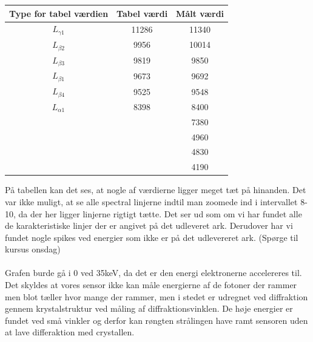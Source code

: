 \documentclass[a4paper,twoside]{article}
\begin{document}
\begin{center}
\begin{tabular}{||c c c ||} 
 \hline
 Type for tabel værdien & Tabel værdi & Målt værdi \\ [0.5ex] 
 \hline\hline
 $L_{\gamma1}$ & 11286 & 11340  \\ 
 \hline
  $L_{\beta2}$ & 9956 & 10014 \\ 
 \hline
$L_{\beta3}$ & 9819  & 9850  \\
 \hline
 $L_{\beta1}$ & 9673 & 9692 \\ [1ex] 
 \hline
 $L_{\beta4}$ & 9525 & 9548 \\
 \hline
 $L_{\alpha1}$ & 8398 & 8400 \\ [1ex] 
  \hline
 & & 7380 \\ [1ex] 
  \hline
 & & 4960 \\ [1ex]  
 \hline
  & & 4830 \\ [1ex] 
 \hline
  & & 4190\\ [ex] 
 \hline
\end{tabular}
\end{center}
På tabellen kan det ses, at nogle af værdierne ligger meget tæt på hinanden. Det var ikke muligt, at se alle spectral linjerne indtil man zoomede ind i intervallet 8-10, da der her ligger linjerne rigtigt tætte. Det ser ud som om vi har fundet alle de karakteristiske linjer der er angivet på det udleveret ark. Derudover har vi fundet nogle spikes ved energier som ikke er på det udlevereret ark. (Spørge til kursus onsdag)\\
\\Grafen burde gå i 0 ved 35keV, da det er den energi elektronerne accelereres til. Det skyldes at vores sensor ikke kan måle energierne af de fotoner der rammer men blot tæller hvor mange der rammer, men i stedet er udregnet ved diffraktion gennem krystalstruktur ved måling af diffraktionsvinklen. De høje energier er fundet ved små vinkler og derfor kan røngten strålingen have ramt sensoren uden at lave differaktion med crystallen.
\end{document}
